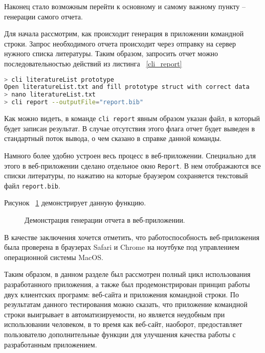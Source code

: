 Наконец стало возможным перейти к основному и самому важному пункту -- генерации самого отчета.

Для начала рассмотрим, как происходит генерация в приложении командной строки. Запрос необходимого отчета
происходит через отправку на сервер нужного списка литературы. Таким образом, запросить отчет можно последовательностью
действий из листинга ~\ref{cli_report}

\begin{lstlisting}[language=bash, caption = {Запрос отчета в приложении командной строки.}, captionpos=b, label={cli_report}]
> cli literatureList prototype
Open literatureList.txt and fill prototype struct with correct data
> nano literatureList.txt
> cli report --outputFile="report.bib"
\end{lstlisting}

Как можно видеть, в команде \texttt{cli report} явным образом указан файл, в который будет записан результат. В случае
отсутствия этого флага отчет будет выведен в стандартный поток вывода, о чем сказано в справке данной команды.

Намного более удобно устроен весь процесс в веб-приложении. Специально для этого в веб-приложении сделано отдельное окно \texttt{Report}.
В нем отображаются все списки литературы, по нажатию на которые браузером сохраняется текстовый файл \texttt{report.bib}.

Рисунок ~\ref{web_report} демонстрирует данную функцию.

\begin{figure}[h!]
	\caption{Демонстрация генерации отчета в веб-приложении.}
	\label{web_report}
\end{figure}

В качестве заключения хочется отметить, что работоспособность веб-приложения была проверена в браузерах Safari и Chrome на ноутбуке
под управлением операционной системы MacOS.

Таким образом, в данном разделе был рассмотрен полный цикл использования разработанного приложения, а также был продемонстрирован
принцип работы двух клиентских программ: веб-сайта и приложения командной строки. По результатам данного тестирования можно сказать, что
приложение командной строки выигрывает в автоматизируемости, но является неудобным при использовании человеком, в то время как 
веб-сайт, наоборот, предоставляет пользователю дополнительные функции для улучшения качества работы с разработанным приложением.
